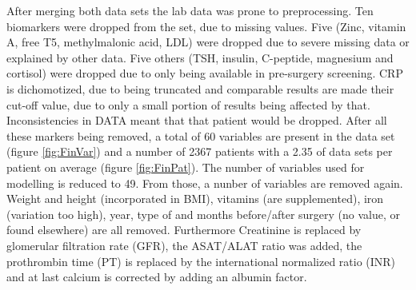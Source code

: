 \documentclass[10pt,a4paper]{article}
\begin{document}
	After merging both data sets the lab data was prone to preprocessing. Ten biomarkers were dropped from the set, due to missing values. Five (Zinc, vitamin A, free T5, methylmalonic acid, LDL) were dropped due to severe missing data or explained by other data. Five others (TSH, insulin, C-peptide, magnesium and cortisol) were dropped due to only being available in pre-surgery screening. CRP is dichomotized, due to being truncated and comparable results are made their cut-off value, due to only a small portion of results being affected by that. Inconsistencies in DATA meant that that patient would be dropped. After all these markers being removed, a total of 60 variables are present in the data set (figure \ref{fig:FinVar}) and a number of 2367 patients with a 2.35 of data sets per patient on average (figure \ref{fig:FinPat}). The number of variables used for modelling is reduced to 49. From those, a nunber of variables are removed again. Weight and height (incorporated in BMI), vitamins (are supplemented), iron (variation too high), year, type of and months before/after surgery (no value, or found elsewhere) are all removed. Furthermore Creatinine is replaced by glomerular filtration rate (GFR), the ASAT/ALAT ratio was added, the prothrombin time (PT) is replaced by the international normalized ratio (INR) and at last calcium is corrected by adding an albumin factor. 
	
\end{document}
